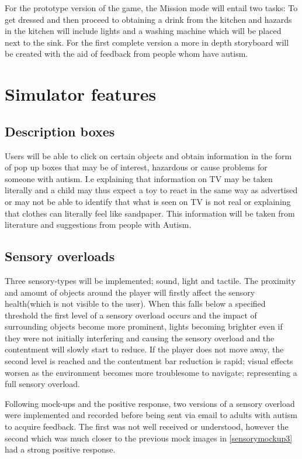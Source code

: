 \documentclass[11pt]{report}
\begin{document}
For the prototype version of the game, the Mission mode will entail two tasks: To get dressed and then proceed to obtaining a drink from the kitchen and hazards in the kitchen will include lights and a washing machine which will be placed next to the sink. For the first complete version a more in depth storyboard will be created with the aid of feedback from people whom have autism. 

\section{Simulator features}

\subsection{Description boxes}
Users will be able to click on certain objects and obtain information in the form of pop up boxes that may be of interest, hazardous or cause problems for someone with autism. I.e explaining that information on TV may be taken literally and a child may thus expect a toy to react in the same way as advertised or may not be able to identify that what is seen on TV is not real or explaining that clothes can literally feel like sandpaper. This information will be taken from literature and suggestions from people with Autism. 

\subsection{Sensory overloads}
Three sensory-types will be implemented; sound, light and tactile. The proximity and amount of objects around the player will firstly affect the sensory health(which is not visible to the user). When this falls below a specified threshold the first level of a sensory overload occurs and the impact of surrounding objects become more prominent, lights becoming brighter even if they were not initially interfering and causing the sensory overload and the contentment will slowly start to reduce. If the player does not move away, the second level is reached and the contentment bar reduction is rapid; visual effects worsen as the environment becomes more troublesome to navigate; representing a full sensory overload.

Following mock-ups and the positive response, two versions of a sensory overload were implemented and recorded before being sent via email to adults with autism to acquire feedback. The first was not well received or understood, however the second which was much closer to the previous mock images in \ref{sensorymockup3} had a strong positive response.  
\end{document}
